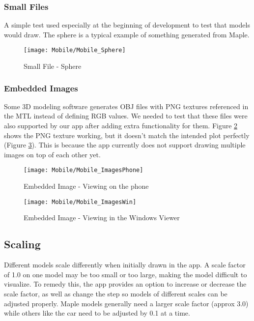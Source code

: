         \subsubsection{Small Files}
        A simple test used especially at the beginning of development to test that models would draw. The sphere is a typical example of something generated from Maple. 
        \begin{figure}[H]
            \texttt{[image: Mobile/Mobile\_Sphere]}
            \centering
            \caption{Small File - Sphere}
            \label{fig:mobileSphere}
        \end{figure}
        
        \subsubsection{Embedded Images}
        Some 3D modeling software generates OBJ files with PNG textures referenced in the MTL instead of defining RGB values. We needed to test that these files were also supported by our app after adding extra functionality for them. Figure \ref{fig:mobileEmbeddedPhone} shows the PNG texture working, but it doesn't match the intended plot perfectly (Figure \ref{fig:mobileEmbeddedWindows}). This is because the app currently does not support drawing multiple images on top of each other yet.
        \begin{figure}[H]
            \texttt{[image: Mobile/Mobile\_ImagesPhone]}
            \centering
            \caption{Embedded Image - Viewing on the phone}
            \label{fig:mobileEmbeddedPhone}
        \end{figure}

        \begin{figure}[H]
            \texttt{[image: Mobile/Mobile\_ImagesWin]}
            \centering
            \caption{Embedded Image - Viewing in the Windows Viewer}
            \label{fig:mobileEmbeddedWindows}
        \end{figure}

        \subsection{Scaling}
        Different models scale differently when initially drawn in the app. A scale factor of 1.0 on one model may be too small or too large, making the model difficult to visualize. To remedy this, the app provides an option to increase or decrease the scale factor, as well as change the step so models of different scales can be adjusted properly. Maple models generally need a larger scale factor (approx 3.0) while others like the car need to be adjusted by 0.1 at a time.
        
